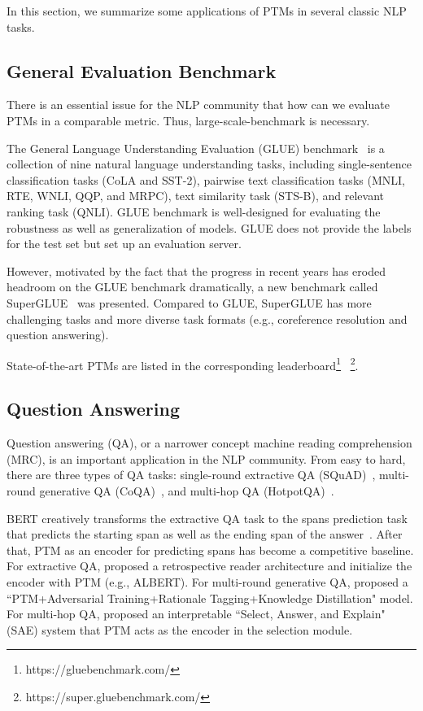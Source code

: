 \documentclass[fleqn]{SCYE-arxiv}
\begin{document}
\begin{multicols}{2}
In this section, we summarize some applications of PTMs in several classic NLP tasks.

\subsection{General Evaluation Benchmark}
\label{sec:app-glue}

There is an essential issue for the NLP community that how can we evaluate PTMs in a comparable metric. Thus, large-scale-benchmark is necessary.

The General Language Understanding Evaluation (GLUE) benchmark~\cite{DBLP:conf/iclr/WangSMHLB19} is a collection of nine natural language understanding tasks, including single-sentence classification tasks (CoLA and SST-2), pairwise text classification tasks (MNLI, RTE, WNLI, QQP, and MRPC), text similarity task (STS-B), and relevant ranking task (QNLI). GLUE benchmark is well-designed for evaluating the robustness as well as generalization of models. GLUE does not provide the labels for the test set but set up an evaluation server.

However, motivated by the fact that the progress in recent years has eroded headroom on the GLUE benchmark dramatically, a new benchmark called SuperGLUE~\cite{DBLP:conf/nips/WangPNSMHLB19} was presented. Compared to GLUE, SuperGLUE has more challenging tasks and more diverse task formats (e.g., coreference resolution and question answering).

State-of-the-art PTMs are listed in the corresponding leaderboard\footnote{https://gluebenchmark.com/} ~\footnote{https://super.gluebenchmark.com/}.





\subsection{Question Answering}

Question answering (QA), or a narrower concept machine reading comprehension (MRC), is an important application in the NLP community. From easy to hard, there are three types of QA tasks: single-round extractive QA (SQuAD)~\cite{rajpurkar2016squad}, multi-round generative QA (CoQA)~\cite{DBLP:journals/tacl/ReddyCM19}, and multi-hop QA (HotpotQA)~\cite{DBLP:conf/emnlp/Yang0ZBCSM18}.

BERT creatively transforms the extractive QA task to the spans prediction task that predicts the starting span as well as the ending span of the answer~\cite{devlin2019bert}. After that, PTM as an encoder for predicting spans has become a competitive baseline. For extractive QA, \citet{zhang2020retrospective} proposed a retrospective reader architecture and initialize the encoder with PTM (e.g., ALBERT). For multi-round generative QA, \citet{ju2019technical} proposed a ``PTM+Adversarial Training+Rationale Tagging+Knowledge Distillation" model. For multi-hop QA, \citet{tu2020select} proposed an interpretable ``Select, Answer, and Explain" (SAE) system that PTM acts as the encoder in the selection module.


\end{multicols}
\end{document}
